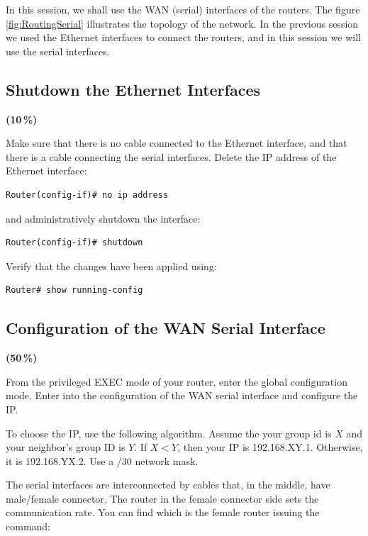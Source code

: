 In this session, we shall use the WAN (serial) interfaces of the routers. The figure \ref{fig:RoutingSerial} illustrates the topology of the network. In the previous session we used the Ethernet interfaces to connect the routers, and in this session we will use the serial interfaces.

\subsection{Shutdown the Ethernet Interfaces}

{\color{red}\textbf{(10\,\%)}}

Make sure that there is no cable connected to the Ethernet interface, and that there is a cable connecting the serial interfaces. Delete the IP address of the Ethernet interface:

\begin{lstlisting}
Router(config-if)# no ip address
\end{lstlisting}

and administratively shutdown the interface:

\begin{lstlisting}
Router(config-if)# shutdown
\end{lstlisting}

Verify that the changes have been applied using:

\begin{lstlisting}
Router# show running-config
\end{lstlisting}

\subsection{Configuration of the WAN Serial Interface}

{\color{red}\textbf{(50\,\%)}}

From the privileged EXEC mode of your router, enter the global configuration mode. Enter into the configuration of the WAN serial interface and configure the IP.

To choose the IP, use the following algorithm. Assume the your group id is $X$ and your neighbor's group ID is $Y$. If $X<Y$, then your IP is 192.168.XY.1. Otherwise, it is 192.168.YX.2. Use a /30 network mask.

The serial interfaces are interconnected by cables that, in the middle, have male/female connector. The router in the female connector side sets the communication rate. You can find which is the female router issuing the command:

